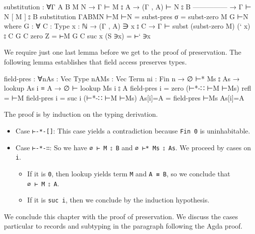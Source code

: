 \begin{fence}
\begin{code}
substitution : ∀{Γ A B M N}
   → Γ ⊢ M ⦂ A
   → (Γ , A) ⊢ N ⦂ B
     ---------------
   → Γ ⊢ N [ M ] ⦂ B
substitution {Γ}{A}{B}{M}{N} ⊢M ⊢N = subst-pres {σ = subst-zero M} G ⊢N
    where
    G : ∀ {C : Type} {x : ℕ}
      → (Γ , A) ∋ x ⦂ C → Γ ⊢ subst (subst-zero M) (` x) ⦂ C
    G {C} {zero} Z = ⊢M
    G {C} {suc x} (S ∋x) = ⊢` ∋x
\end{code}
\end{fence}

We require just one last lemma before we get to the proof of
preservation. The following lemma establishes that field access
preserves types.

\begin{fence}
\begin{code}
field-pres : ∀{n}{As : Vec Type n}{A}{Ms : Vec Term n}{i : Fin n}
         → ∅ ⊢* Ms ⦂ As
         → lookup As i ≡ A
         → ∅ ⊢ lookup Ms i ⦂ A
field-pres {i = zero} (⊢*-∷ ⊢M ⊢Ms) refl = ⊢M
field-pres {i = suc i} (⊢*-∷ ⊢M ⊢Ms) As[i]=A = field-pres ⊢Ms As[i]=A
\end{code}
\end{fence}

The proof is by induction on the typing derivation.

\begin{itemize}
\item
  Case \texttt{⊢-*-{[}{]}}: This case yields a contradiction because
  \texttt{Fin\ 0} is uninhabitable.
\item
  Case \texttt{⊢-*-∷}: So we have \texttt{∅\ ⊢\ M\ ⦂\ B} and
  \texttt{∅\ ⊢*\ Ms\ ⦂\ As}. We proceed by cases on \texttt{i}.

  \begin{itemize}
  \item
    If it is \texttt{0}, then lookup yields term \texttt{M} and
    \texttt{A\ ≡\ B}, so we conclude that \texttt{∅\ ⊢\ M\ ⦂\ A}.
  \item
    If it is \texttt{suc\ i}, then we conclude by the induction
    hypothesis.
  \end{itemize}
\end{itemize}

We conclude this chapter with the proof of preservation. We discuss the
cases particular to records and subtyping in the paragraph following the
Agda proof.

